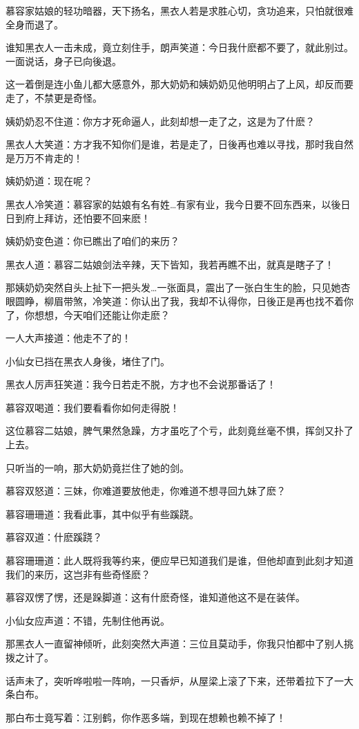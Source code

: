\documentclass[12pt,oneside]{book}
\begin{document}
慕容家姑娘的轻功暗器，天下扬名，黑衣人若是求胜心切，贪功追来，只怕就很难全身而退了。

谁知黑衣人一击未成，竟立刻住手，朗声笑道：今日我什麽都不要了，就此别过。一面说话，身子已向後退。

这一着倒是连小鱼儿都大感意外，那大奶奶和姨奶奶见他明明占了上风，却反而要走了，不禁更是奇怪。

姨奶奶忍不住道：你方才死命逼人，此刻却想一走了之，这是为了什麽？

黑衣人大笑道：方才我不知你们是谁，若是走了，日後再也难以寻找，那时我自然是万万不肯走的！

姨奶奶道：现在呢？

黑衣人冷笑道：慕容家的姑娘有名有姓\ldots 有家有业，我今日要不回东西来，以後日日到府上拜访，还怕要不回来麽！

姨奶奶变色道：你已瞧出了咱们的来历？

黑衣人道：慕容二姑娘剑法辛辣，天下皆知，我若再瞧不出，就真是瞎子了！

那姨奶奶突然自头上扯下一把头发\ldots 一张面具，震出了一张白生生的脸，只见她杏眼圆睁，柳眉带煞，冷笑道：你认出了我，我却不认得你，日後正是再也找不着你了，你想想，今天咱们还能让你走麽？

一人大声接道：他走不了的！

小仙女已挡在黑衣人身後，堵住了门。

黑衣人厉声狂笑道：我今日若走不脱，方才也不会说那番话了！

慕容双喝道：我们要看看你如何走得脱！

这位慕容二姑娘，脾气果然急躁，方才虽吃了个亏，此刻竟丝毫不惧，挥剑又扑了上去。

只听当的一响，那大奶奶竟拦住了她的剑。

慕容双怒道：三妹，你难道要放他走，你难道不想寻回九妹了麽？

慕容珊珊道：我看此事，其中似乎有些蹊跷。

慕容双道：什麽蹊跷？

慕容珊珊道：此人既将我等约来，便应早已知道我们是谁，但他却直到此刻才知道我们的来历，这岂非有些奇怪麽？

慕容双愣了愣，还是跺脚道：这有什麽奇怪，谁知道他这不是在装佯。

小仙女应声道：不错，先制住他再说。

那黑衣人一直留神倾听，此刻突然大声道：三位且莫动手，你我只怕都中了别人挑拨之计了。

话声未了，突听哗啦啦一阵响，一只香炉，从屋梁上滚了下来，还带着拉下了一大条白布。

那白布士竟写着：江别鹤，你作恶多端，到现在想赖也赖不掉了！
\end{document}
